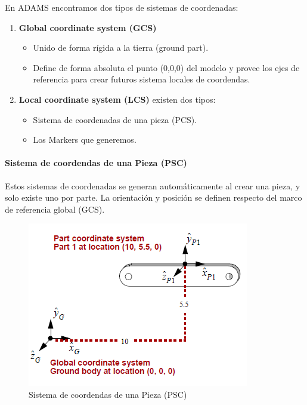         En ADAMS encontramos dos tipos de sistemas de coordenadas:
        
        \begin{enumerate}
            \item \textbf{Global coordinate system (GCS) }
            \begin{itemize}
                \item Unido de forma rígida a la tierra (ground part).
                \item Define de forma absoluta el punto (0,0,0) del modelo y provee los ejes de referencia para crear futuros sistema locales de coordendas.
            \end{itemize}
            \item \textbf{Local coordinate system (LCS)} existen dos tipos:
            \begin{itemize}
                \item Sistema de coordenadas de una pieza (PCS).
                \item Los Markers que generemos.
            \end{itemize}
        \end{enumerate}
        
        \paragraph{Sistema de coordendas de una Pieza (PSC)}
        
        Estos sistemas de coordenadas se generan automáticamente al crear una pieza, y solo existe uno por parte. La orientación y posición se definen respecto del marco de referencia global (GCS).
        
        \begin{figure}[H]
            \centering
            \includegraphics[width=0.5\linewidth]{Main/Chapter3/Images3/papeo/pcs.png}
            \caption{Sistema de coordendas de una Pieza (PSC) \cite{adams-basic}}
            \label{f:Cap3-adams_psc}
        \end{figure} 
        
